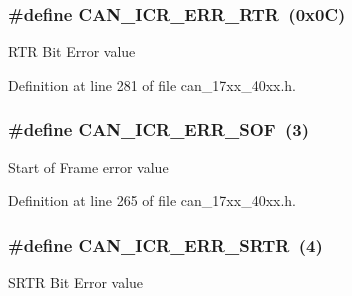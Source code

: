 \subsubsection[{\texorpdfstring{C\+A\+N\+\_\+\+I\+C\+R\+\_\+\+E\+R\+R\+\_\+\+R\+TR}{CAN_ICR_ERR_RTR}}]{\setlength{\rightskip}{0pt plus 5cm}\#define C\+A\+N\+\_\+\+I\+C\+R\+\_\+\+E\+R\+R\+\_\+\+R\+TR~(0x0\+C)}\hypertarget{group__CAN__17XX__40XX_gabe25510882df75fa40045dd344b864e9}{}\label{group__CAN__17XX__40XX_gabe25510882df75fa40045dd344b864e9}
R\+TR Bit Error value 

Definition at line 281 of file can\+\_\+17xx\+\_\+40xx.\+h.

\subsubsection[{\texorpdfstring{C\+A\+N\+\_\+\+I\+C\+R\+\_\+\+E\+R\+R\+\_\+\+S\+OF}{CAN_ICR_ERR_SOF}}]{\setlength{\rightskip}{0pt plus 5cm}\#define C\+A\+N\+\_\+\+I\+C\+R\+\_\+\+E\+R\+R\+\_\+\+S\+OF~(3)}\hypertarget{group__CAN__17XX__40XX_ga43d081dee709043e9b2db1830b244efe}{}\label{group__CAN__17XX__40XX_ga43d081dee709043e9b2db1830b244efe}
Start of Frame error value 

Definition at line 265 of file can\+\_\+17xx\+\_\+40xx.\+h.

\subsubsection[{\texorpdfstring{C\+A\+N\+\_\+\+I\+C\+R\+\_\+\+E\+R\+R\+\_\+\+S\+R\+TR}{CAN_ICR_ERR_SRTR}}]{\setlength{\rightskip}{0pt plus 5cm}\#define C\+A\+N\+\_\+\+I\+C\+R\+\_\+\+E\+R\+R\+\_\+\+S\+R\+TR~(4)}\hypertarget{group__CAN__17XX__40XX_ga19d41d01d80224aac902c69f5331c733}{}\label{group__CAN__17XX__40XX_ga19d41d01d80224aac902c69f5331c733}
S\+R\+TR Bit Error value 


